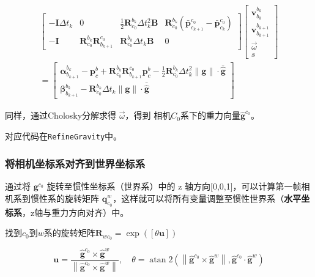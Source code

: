 \documentclass[12pt,a4paper]{article}
\begin{document}
\begin{equation}
\begin{aligned}
\begin{bmatrix}
-\mathbf{I} \Delta t_{k} & 0 & \frac{1}{2} \mathbf{R}^{b_{k}}_{c_{0}} \Delta t_{k}^{2} \mathbf{B} &
\mathbf{R}^{b_{k}}_{c_{0}} (\bar{\mathbf{p}}^{c_{0}}_{c_{k+1}} - \bar{\mathbf{p}}^{c_{0}}_{c_{k}}) \\
-\mathbf{I} & \mathbf{R}^{b_{k}}_{c_{0}} \mathbf{R}^{c_0}_{b_{k+1}} & \mathbf{R}^{b_{k}}_{c_{0}}\Delta t_{k} \mathbf{B} & 0
\end{bmatrix}
\begin{bmatrix}
\mathbf{v}^{b_{k}}_{b_{k}} \\
\mathbf{v}^{b_{k+1}}_{b_{k+1}} \\
\vec{\omega} \\
s
\end{bmatrix} 
\\=
\begin{bmatrix}
\boldsymbol{\alpha}^{b_{k}}_{b_{k+1}} - \mathbf{p}_c^b + \mathbf{R}^{b_{k}}_{c_{0}} \mathbf{R}^{c_0}_{b_{k+1}} \mathbf{p}_c^b -
\frac{1}{2} \mathbf{R}^{b_{k}}_{c_{0}} \Delta t_{k}^{2} \|\mathbf{g}\| \cdot \bar{\hat{\mathbf{g}}}\\
\boldsymbol{\beta}^{b_{k}}_{b_{k+1}} -
\mathbf{R}^{b_{k}}_{c_{0}} \Delta t_{k} \|\mathbf{g}\| \cdot \bar{\hat{\mathbf{g}}}
\end{bmatrix}
\end{aligned}
\end{equation}

同样，通过Cholosky分解求得 $\vec{\omega}$，得到 相机$C_0$系下的重力向量$\hat{\mathbf{g}}^{c_0}$。

对应代码在\verb|RefineGravity|中。

\subsubsection{将相机坐标系对齐到世界坐标系}

通过将 $\mathbf{g}^{c_{0}}$ 旋转至惯性坐标系（世界系）中的 z 轴方向[0,0,1]，可以计算第一帧相机系到惯性系的旋转矩阵 $\mathbf{q}_{c_0}^w$，这样就可以将所有变量调整至惯性世界系（\textbf{水平坐标系}，z轴与重力方向对齐）中。

找到$c_0$到$w$系的旋转矩阵$\mathbf{R}_{w c_{0}}=\exp ([\theta \mathbf{u}])$

\begin{equation}
\mathbf{u}
=
\frac{\hat{\mathbf{g}}^{c_{0}} \times \hat{\mathbf{g}}^{w}}{\left\|\hat{\mathbf{g}}^{c_{0}} \times \hat{\mathbf{g}}^{w}\right\|}, \quad 
\theta
=
\operatorname{atan} 2\left(\left\|\hat{\mathbf{g}}^{c_{0}} \times \hat{\mathbf{g}}^{w}\right\|, \hat{\mathbf{g}}^{c_{0}} \cdot \hat{\mathbf{g}}^{w}\right)
\end{equation}
\end{document}
